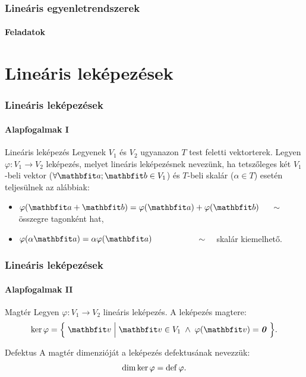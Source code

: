 \documentclass[xcolor={table}]{beamer}
\begin{document}
\begin{frame}
  \frametitle{Lineáris egyenletrendszerek}
  \framesubtitle{Feladatok}

  \vfill
  
  \vfill
  
  \vfill
\end{frame}

\section{Lineáris leképezések}
\begin{frame}
  \frametitle{Lineáris leképezések}
  \framesubtitle{Alapfogalmak I}

  \begin{block}{Lineáris leképezés}
    Legyenek $V_1$ és $V_2$ ugyanazon $T$ test feletti vektorterek. Legyen
    $\varphi: V_1 \rightarrow V_2$ leképezés, melyet lineáris leképezésnek
    nevezünk, ha tetszőleges két $V_1$-beli vektor ($\forall \rvec a; \rvec b \in
      V_1$) és $T$-beli skalár ($\alpha \in T$) esetén teljesülnek az alábbiak:
    \begin{itemize}
      \item $\varphi(\rvec a + \rvec b) = \varphi(\rvec a) + \varphi(\rvec b)$
            $\quad \sim \quad$ összegre tagonként hat,
      \item $\varphi(\alpha \rvec a) = \alpha \varphi(\rvec a)$
            $\hspace{18mm} \sim \quad$ skalár kiemelhető.
    \end{itemize}
  \end{block}
\end{frame}

\begin{frame}
  \frametitle{Lineáris leképezések}
  \framesubtitle{Alapfogalmak II}

  \vfill
  \begin{block}{Magtér}
    Legyen $\varphi: V_1 \rightarrow V_2$ lineáris leképezés. A leképezés
    magtere:
    \[
      \ker \varphi = \Big\{\;
      \rvec v \;\Big|\; \rvec v \in V_1 \;\land\;
      \varphi(\rvec v) = \nvec
      \;\Big\}
      \text.
    \]
  \end{block}
  \vfill
  \begin{block}{Defektus}
    A magtér dimenzióját a leképezés defektusának nevezzük:
    \[
      \operatorname{dim} \ker \varphi = \operatorname{def} \varphi
      \text.
    \]
  \end{block}
  \vfill
\end{frame}
\end{document}
